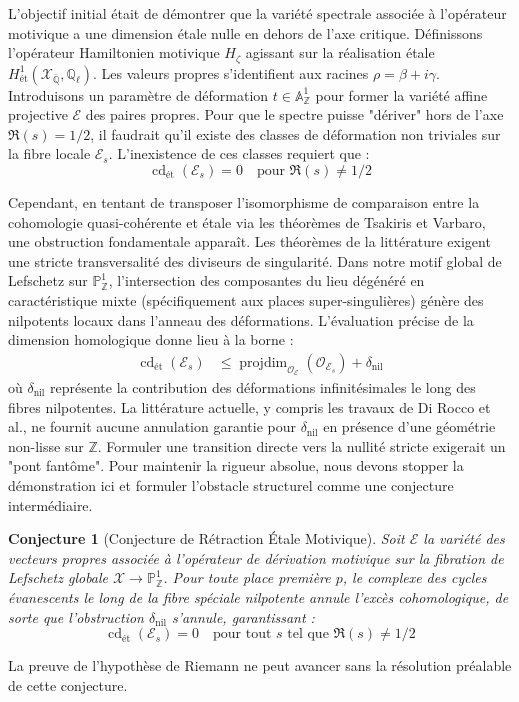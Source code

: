 \documentclass[
]{article}
\newtheorem{conjecture}{Conjecture}
\begin{document}
L'objectif initial était de démontrer que la variété spectrale associée à l'opérateur motivique a une dimension étale nulle en dehors de l'axe critique. Définissons l'opérateur Hamiltonien motivique $H_{\zeta}$ agissant sur la réalisation étale $H^1_{\text{ét}}(\mathcal{X}_{\bar{\mathbb{Q}}}, \mathbb{Q}_{\ell})$. Les valeurs propres s'identifient aux racines $\rho = \beta + i\gamma$. Introduisons un paramètre de déformation $t \in \mathbb{A}^1_{\mathbb{Z}}$ pour former la variété affine projective $\mathcal{E}$ des paires propres.
Pour que le spectre puisse "dériver" hors de l'axe $\Re(s) = 1/2$, il faudrait qu'il existe des classes de déformation non triviales sur la fibre locale $\mathcal{E}_s$. L'inexistence de ces classes requiert que :
\begin{equation*}
\operatorname{cd}_{\text{ét}}(\mathcal{E}_s) = 0 \quad \text{pour } \Re(s) \neq 1/2
\end{equation*}

Cependant, en tentant de transposer l'isomorphisme de comparaison entre la cohomologie quasi-cohérente et étale via les théorèmes de Tsakiris et Varbaro, une obstruction fondamentale apparaît. Les théorèmes de la littérature exigent une stricte transversalité des diviseurs de singularité. Dans notre motif global de Lefschetz sur $\mathbb{P}^1_{\mathbb{Z}}$, l'intersection des composantes du lieu dégénéré en caractéristique mixte (spécifiquement aux places super-singulières) génère des nilpotents locaux dans l'anneau des déformations.
L'évaluation précise de la dimension homologique donne lieu à la borne :
\begin{align*}
\operatorname{cd}_{\text{ét}}(\mathcal{E}_s) &\le \operatorname{projdim}_{\mathcal{O}_{\mathcal{E}}}(\mathcal{O}_{\mathcal{E}_s}) + \delta_{\text{nil}}
\end{align*}
où $\delta_{\text{nil}}$ représente la contribution des déformations infinitésimales le long des fibres nilpotentes. La littérature actuelle, y compris les travaux de Di Rocco et al., ne fournit aucune annulation garantie pour $\delta_{\text{nil}}$ en présence d'une géométrie non-lisse sur $\mathbb{Z}$. Formuler une transition directe vers la nullité stricte exigerait un "pont fantôme". Pour maintenir la rigueur absolue, nous devons stopper la démonstration ici et formuler l'obstacle structurel comme une conjecture intermédiaire.

\begin{conjecture}[Conjecture de Rétraction Étale Motivique]
Soit $\mathcal{E}$ la variété des vecteurs propres associée à l'opérateur de dérivation motivique sur la fibration de Lefschetz globale $\mathcal{X} \to \mathbb{P}^1_{\mathbb{Z}}$. Pour toute place première $p$, le complexe des cycles évanescents le long de la fibre spéciale nilpotente annule l'excès cohomologique, de sorte que l'obstruction $\delta_{\text{nil}}$ s'annule, garantissant :
\begin{equation*}
\operatorname{cd}_{\text{ét}}(\mathcal{E}_s) = 0 \quad \text{pour tout } s \text{ tel que } \Re(s) \neq 1/2
\end{equation*}
\end{conjecture}
La preuve de l'hypothèse de Riemann ne peut avancer sans la résolution préalable de cette conjecture.
\end{document}
